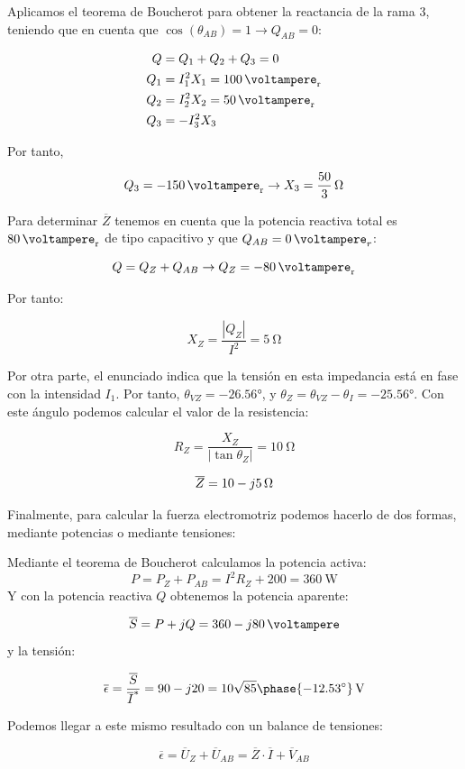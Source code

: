 Aplicamos el teorema de Boucherot para obtener la reactancia de la rama 3, teniendo que en cuenta que $\cos(\theta_{AB}) = 1 \rightarrow Q_{AB} = 0$:

\begin{align*}
  Q &= Q_1 + Q_2 + Q_3 = 0\\
  Q_1 &= I_1^2 X_1 = \qty{100}{\voltampere_r}\\
  Q_2 &= I_2^2 X_2 = \qty{50}{\voltampere_r}\\
  Q_3 &= - I_3^2 X_3
\end{align*}

Por tanto,

\[
   Q_3 = -\qty{150}{\voltampere_r} \rightarrow X_3 = \qty[parse-numbers=false]{\frac{50}{3}}{\ohm}
\]

Para determinar $\overline{Z}$ tenemos en cuenta que la potencia reactiva total es $\qty{80}{\voltampere_r}$ de tipo capacitivo y que $Q_{AB} = \qty{0}{\voltampere}_r$:

\[
  Q = Q_Z + Q_{AB} \rightarrow Q_Z = -\qty{80}{\voltampere_r} 
\]

Por tanto:

\[
  X_Z = \frac{|Q_Z|}{I^2} = \qty{5}{\ohm}
\]

Por otra parte, el enunciado indica que la tensión en esta impedancia está en fase con la intensidad $I_1$. Por tanto, $\theta_{VZ} = \ang{-26.56}$, y $\theta_Z = \theta_{VZ} - \theta_{I} = \ang{-25.56}$. Con este ángulo podemos calcular el valor de la resistencia:

\[
  R_Z = \frac{X_Z}{|\tan\theta_Z|} = \qty{10}{\ohm}
\]

\[
  \overline{Z} =  \qty[parse-numbers=false]{10 - j5}{\ohm}
\]

Finalmente, para calcular la fuerza electromotriz podemos hacerlo de dos formas, mediante potencias o mediante tensiones:

Mediante el teorema de Boucherot calculamos la potencia activa:
\[
P = P_Z + P_{AB} = I^2 R_Z + 200 = \qty{360}{\watt}
\]
Y con la potencia reactiva $Q$ obtenemos la potencia aparente:

\[
  \overline{S} = P + jQ = \qty[parse-numbers=false]{360 -j80}{\voltampere}
\]
y la tensión:

\[
  \overline{\epsilon} = \frac{\overline{S}}{\overline{I}^*} = 90 - j20 = \qty[parse-numbers=false]{10\sqrt{85}\phase{\ang{-12.53}}}{\volt}
\]

Podemos llegar a este mismo resultado con un balance de tensiones:

\[
  \overline{\epsilon} = \overline{U}_Z + \overline{U}_{AB} = \overline{Z} \cdot \overline{I} + \overline{V}_{AB}
\]
